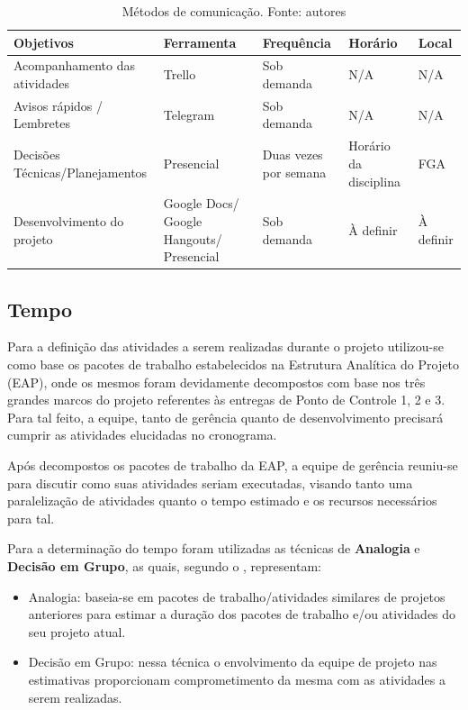       \begin{table}[!htbp]
        \begin{center}
          \caption{\label{tab:com}Métodos de comunicação. Fonte: autores}
          \begin{tabular}{|p{4cm}|p{4cm}|p{3cm}|p{3cm}|p{2cm}|}
            \hline
            \textbf{Objetivos} & \textbf{Ferramenta} & \textbf{Frequência} & \textbf{Horário} & \textbf{Local}\\\hline\hline
            Acompanhamento das atividades & Trello & Sob demanda & N/A & N/A\\\hline
            Avisos rápidos / Lembretes & Telegram & Sob demanda & N/A & N/A\\\hline
            Decisões Técnicas/Planejamentos & Presencial & Duas vezes por semana & Horário da disciplina & FGA\\\hline
            Desenvolvimento do projeto & Google Docs/ Google Hangouts/ Presencial & Sob demanda & À definir & À definir\\\hline
          \end{tabular}
        \end{center}
      \end{table}

    \subsection{Tempo}

      Para a definição das atividades a serem realizadas durante o
      projeto utilizou-se como base os pacotes de trabalho estabelecidos
      na Estrutura Analítica do Projeto (EAP), onde os mesmos foram devidamente
      decompostos com base nos três grandes marcos do projeto referentes
      às entregas de Ponto de Controle 1, 2 e 3. Para tal feito, a equipe,
      tanto de gerência quanto de desenvolvimento precisará cumprir
      as atividades elucidadas no cronograma.

      Após decompostos os pacotes de trabalho da EAP, a equipe
      de gerência reuniu-se para discutir como suas atividades seriam
      executadas, visando tanto uma paralelização de atividades quanto
      o tempo estimado e os recursos necessários para tal.

      Para a determinação do tempo foram utilizadas as
      técnicas de \textbf{Analogia} e \textbf{Decisão em Grupo},
      as quais, segundo o \cite{PMI2012}, representam:

      \begin{itemize}
        \item Analogia: baseia-se em pacotes de trabalho/atividades similares
        de projetos anteriores para estimar a duração dos pacotes de trabalho
        e/ou atividades do seu projeto atual.
        \item Decisão em Grupo: nessa técnica o envolvimento da equipe de projeto
        nas estimativas proporcionam comprometimento da mesma com as
        atividades a serem realizadas.
      \end{itemize}

